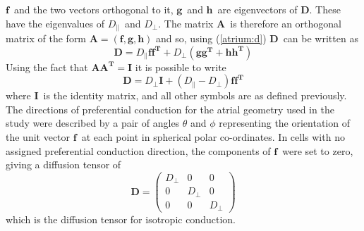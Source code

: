$\mathbf{f}$\ and the two vectors orthogonal to it, $\mathbf{g}$\ and
$\mathbf{h}$\ are eigenvectors of $\mathbf{D}$.
These have the eigenvalues of $D_{\parallel}$\ and $D_{\perp}$.
The matrix $\mathbf{A}$\ is therefore an orthogonal matrix of the form
$\mathbf{A} = \left(\mathbf{f},\mathbf{g},\mathbf{h}\right)$ and so, using
(\ref{atrium:d}) $\mathbf{D}$\ can be written as
\begin{equation}
\label{atrium:dfgh}
\mathbf{D} = D_{\parallel}\mathbf{f}\mathbf{f^{T}} +
D_{\perp}\left(\mathbf{g}\mathbf{g^{T}} + \mathbf{h}\mathbf{h^{T}}\right)
\end{equation}
Using the fact that $\mathbf{A}\mathbf{A^T} = \mathbf{I}$ it is possible to
write
\begin{equation}
\label{atrium:dwithf}
\mathbf{D} = D_{\perp}\mathbf{I} + \left(D_{\parallel}-D_{\perp}\right)\mathbf{f}\mathbf{f^{T}}
\end{equation}
where $\mathbf{I}$\ is the identity matrix, and all other symbols are as defined
previously.
The directions of preferential conduction for the atrial geometry used in the
study were described by a pair of angles $\theta$ and $\phi$ representing the
orientation of the unit vector $\mathbf{f}$\ at each point in spherical polar
co-ordinates.
In cells with no assigned preferential conduction direction, the components of
$\mathbf{f}$\ were set to zero, giving a diffusion tensor of
\begin{equation}
\label{atrium:dnofibre}
\mathbf{D} =
\begin{pmatrix}
D_{\perp} & 0 & 0\\
0 & D_{\perp} & 0\\
0 & 0 & D_{\perp}
\end{pmatrix}
\end{equation}
which is the diffusion tensor for isotropic conduction.

